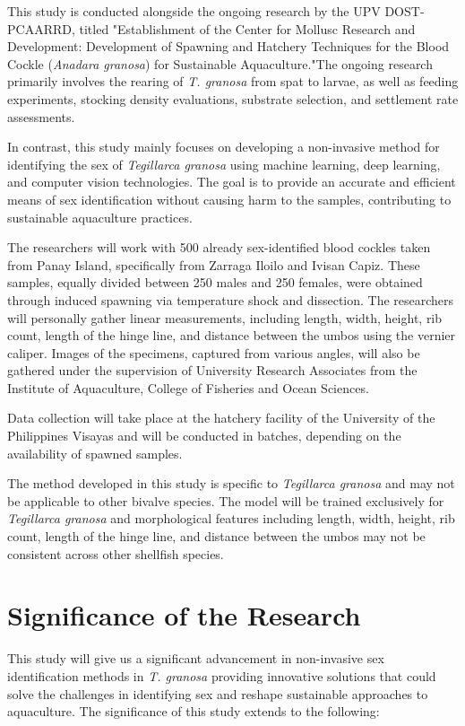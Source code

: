 This study is conducted alongside the ongoing research by the UPV DOST-PCAARRD, titled "Establishment of the Center for Mollusc Research and Development: Development of Spawning and Hatchery Techniques for the Blood Cockle (\textit{Anadara granosa}) for Sustainable Aquaculture."The ongoing research primarily involves the rearing of \textit{T. granosa} from spat to larvae, as well as feeding experiments, stocking density evaluations, substrate selection, and settlement rate assessments.

In contrast, this study mainly focuses on developing a non-invasive method for identifying the sex of \textit{Tegillarca granosa} using machine learning, deep learning, and computer vision technologies. The goal is to provide an accurate and efficient means of sex identification without causing harm to the samples, contributing to sustainable aquaculture practices.

The researchers will work with 500 already sex-identified blood cockles taken from Panay Island, specifically from Zarraga Iloilo and Ivisan Capiz. These samples, equally divided between 250 males and 250 females, were obtained through induced spawning via temperature shock and dissection. The researchers will personally gather linear measurements, including length, width, height, rib count, length of the hinge line, and distance between the umbos using the vernier caliper. Images of the specimens, captured from various angles, will also be gathered under the supervision of University Research Associates from the Institute of Aquaculture, College of Fisheries and Ocean Sciences.

Data collection will take place at the hatchery facility of the University of the Philippines Visayas and will be conducted in batches, depending on the availability of spawned samples.

The method developed in this study is specific to \textit{Tegillarca granosa} and may not be applicable to other bivalve species. The model will be trained exclusively for \textit{Tegillarca granosa} and morphological features including length, width, height, rib count, length of the hinge line, and distance between the umbos may not be consistent across other shellfish species. 

\section{Significance of the Research}
\label{sec:significance}

This study will give us a significant advancement in non-invasive sex identification methods in \textit{T. granosa} providing innovative solutions that could solve the challenges in identifying sex and reshape sustainable approaches to aquaculture. The significance of this study extends to the following:

